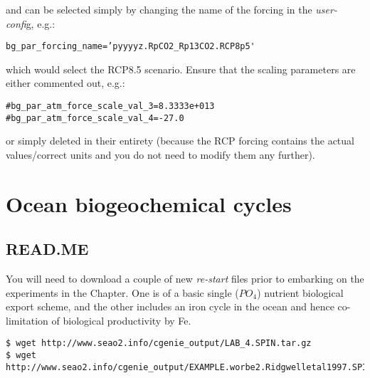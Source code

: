 \documentclass[11pt,fleqn]{book} %
\begin{document}
\noindent and can be selected simply by changing the name of the forcing in the \textit{user-confi}g, e.g.:
\vspace{-2pt}\begin{verbatim}
bg_par_forcing_name=’pyyyyz.RpCO2_Rp13CO2.RCP8p5'
\end{verbatim}\vspace{-2pt}
\noindent which would select the RCP8.5 scenario. Ensure that
the scaling parameters are either commented out, e.g.:
\vspace{-2pt}\begin{verbatim}
#bg_par_atm_force_scale_val_3=8.3333e+013
#bg_par_atm_force_scale_val_4=-27.0
\end{verbatim}\vspace{-2pt}
\noindent or simply deleted in their entirety (because the RCP forcing contains the actual values/correct units and you do not need to modify them any further).


\cleardoublepage


\chapter{Ocean biogeochemical cycles}

\hfill \break

\vspace{24mm}

\noindent 


\newpage



\section*{READ.ME}

You will need to download a couple of new \textit{re-start} files prior to embarking on the experiments in the Chapter. One is of a basic single (\(PO_{4}\)) nutrient biological export scheme, and the other includes an iron cycle in the ocean and hence co-limitation of biological productivity by Fe.
\vspace{-2mm} \small
\begin{verbatim}
$ wget http://www.seao2.info/cgenie_output/LAB_4.SPIN.tar.gz
$ wget http://www.seao2.info/cgenie_output/EXAMPLE.worbe2.Ridgwelletal1997.SPIN.tar.gz
\end{verbatim} \normalsize 
\end{document}
